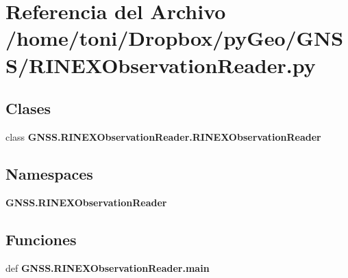 \section{Referencia del Archivo /home/toni/\-Dropbox/py\-Geo/\-G\-N\-S\-S/\-R\-I\-N\-E\-X\-Observation\-Reader.py}
\label{RINEXObservationReader_8py}
\subsection*{Clases}
\begin{DoxyCompactItemize}
\item 
class {\bf G\-N\-S\-S.\-R\-I\-N\-E\-X\-Observation\-Reader.\-R\-I\-N\-E\-X\-Observation\-Reader}
\end{DoxyCompactItemize}
\subsection*{Namespaces}
\begin{DoxyCompactItemize}
\item 
{\bf G\-N\-S\-S.\-R\-I\-N\-E\-X\-Observation\-Reader}
\end{DoxyCompactItemize}
\subsection*{Funciones}
\begin{DoxyCompactItemize}
\item 
def {\bf G\-N\-S\-S.\-R\-I\-N\-E\-X\-Observation\-Reader.\-main}
\end{DoxyCompactItemize}
